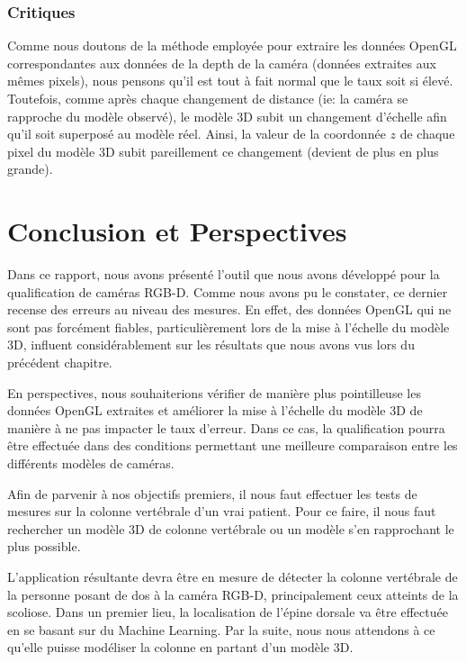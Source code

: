 \documentclass[a4paper, 12pt]{book}
\begin{document}
\subsection{Critiques}
Comme nous doutons de la méthode employée pour extraire les données OpenGL correspondantes aux données de la depth de la caméra (données extraites aux mêmes pixels), nous pensons qu'il est tout à fait normal que le taux soit si élevé. Toutefois, comme après chaque changement de distance (ie: la caméra se rapproche du modèle observé), le modèle 3D subit un changement d'échelle afin qu'il soit superposé au modèle réel. Ainsi, la valeur de la coordonnée $z$ de chaque pixel du modèle 3D subit pareillement ce changement (devient de plus en plus grande).



\chapter{Conclusion et Perspectives\label{chap-conclusion}}
\par Dans ce rapport, nous avons présenté l'outil que nous avons développé pour la qualification de caméras RGB-D. Comme nous avons pu le constater, ce dernier recense des erreurs au niveau des mesures. En effet, des données OpenGL qui ne sont pas forcément fiables, particulièrement lors de la mise à l'échelle du modèle 3D, influent considérablement sur les résultats que nous avons vus lors du précédent chapitre.
\par En perspectives, nous souhaiterions vérifier de manière plus pointilleuse les données OpenGL extraites et améliorer la mise à l'échelle du modèle 3D de manière à ne pas impacter le taux d'erreur.
Dans ce cas, la qualification pourra être effectuée dans des conditions permettant une meilleure comparaison entre les différents modèles de caméras.  
\par Afin de parvenir à nos objectifs premiers, il nous faut effectuer les tests de mesures sur la colonne vertébrale d'un vrai patient. Pour ce faire, il nous faut rechercher un modèle 3D de colonne vertébrale ou un modèle s'en rapprochant le plus possible. 

\par L'application résultante devra être en mesure de détecter la colonne vertébrale de la personne posant de dos à la caméra RGB-D, principalement ceux atteints de la scoliose. Dans un premier lieu, la localisation de l'épine dorsale va être effectuée en se basant sur du Machine Learning. Par la suite, nous nous attendons à ce qu'elle puisse modéliser la colonne en partant d'un modèle 3D. 

\nocite{*}
%	
%
\printbibliography
\end{document}
